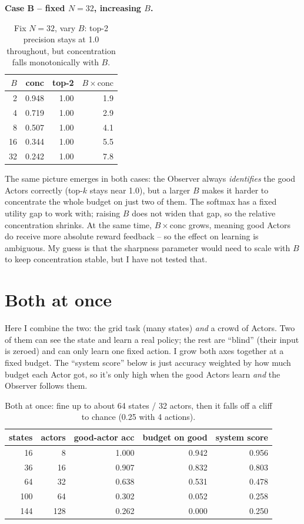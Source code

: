 \documentclass[11pt]{article}
\begin{document}
\textbf{Case B -- fixed $N = 32$, increasing $B$.}

\begin{table}[H]
\centering
\begin{tabular}{rrrr}
\toprule
$B$ & conc & top-2 & $B \times \text{conc}$ \\
\midrule
2  & 0.948 & 1.00 & 1.9 \\
4  & 0.719 & 1.00 & 2.9 \\
8  & 0.507 & 1.00 & 4.1 \\
16 & 0.344 & 1.00 & 5.5 \\
32 & 0.242 & 1.00 & 7.8 \\
\bottomrule
\end{tabular}
\caption{Fix $N = 32$, vary $B$: top-2 precision stays at 1.0 throughout, but
concentration falls monotonically with $B$.}
\end{table}

The same picture emerges in both cases: the Observer always \emph{identifies}
the good Actors correctly (top-$k$ stays near 1.0), but a larger $B$ makes it
harder to concentrate the whole budget on just two of them. The softmax has a
fixed utility gap to work with; raising $B$ does not widen that gap, so the
relative concentration shrinks. At the same time, $B \times \text{conc}$
grows, meaning good Actors do receive more absolute reward feedback -- so the
effect on learning is ambiguous. My guess is that the sharpness parameter would
need to scale with $B$ to keep concentration stable, but I have not tested that.

\section{Both at once}

Here I combine the two: the grid task (many states) \emph{and} a crowd of Actors.
Two of them can see the state and learn a real policy; the rest are ``blind''
(their input is zeroed) and can only learn one fixed action. I grow both axes
together at a fixed budget. The ``system score'' below is just accuracy weighted
by how much budget each Actor got, so it's only high when the good Actors learn
\emph{and} the Observer follows them.

\begin{table}[H]
\centering
\begin{tabular}{rrrrr}
\toprule
states & actors & good-actor acc & budget on good & system score \\
\midrule
16  & 8   & 1.000 & 0.942 & 0.956 \\
36  & 16  & 0.907 & 0.832 & 0.803 \\
64  & 32  & 0.638 & 0.531 & 0.478 \\
100 & 64  & 0.302 & 0.052 & 0.258 \\
144 & 128 & 0.262 & 0.000 & 0.250 \\
\bottomrule
\end{tabular}
\caption{Both at once: fine up to about 64 states / 32 actors, then it falls off a
cliff to chance (0.25 with 4 actions).}
\end{table}
\end{document}
